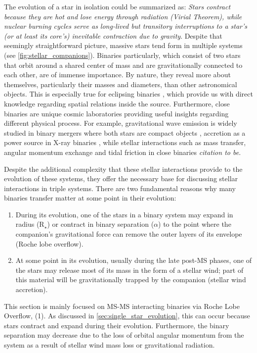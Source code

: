 The evolution of a star in isolation could be summarized as: {\it Stars contract because they are hot and lose energy through radiation (Virial Theorem), while nuclear burning cycles serve as long-lived but transitory interruptions to a star's (or at least its core's) inevitable contraction due to gravity}. Despite that seemingly straightforward picture, massive stars tend form in multiple systems (see \cref{fig:stellar_companions}). Binaries particularly, which consist of two stars that orbit around a shared center of mass and are gravitationally connected to each other, are of immense importance. By nature,  they reveal more about themselves, particularly their masses and diameters, than other astronomical objects. This is especially true for eclipsing binaries \citep{prvsa2016physics}, which provide us with direct knowledge regarding spatial relations inside the source. Furthermore, close binaries are unique cosmic laboratories providing useful insights regarding different physical process. For example, gravitational wave emission is widely studied in binary mergers where both stars are compact objects \citep{cutler1994gravitational,abbott2017gw170608,abbott2019gwtc}, accretion as a power source in X-ray binaries \citep{lewin1997x,reig2011x}, while stellar interactions such as mass transfer, angular momentum exchange and tidal friction in close binaries {\it citation to be}. 

Despite the additional complexity that these stellar interactions provide to the evolution of these systems, they offer the necessary base for discussing stellar interactions in triple systems.  There are two fundamental reasons why many binaries transfer matter at some point in their evolution:

\begin{enumerate}
    \item During its evolution, one of the stars in a binary system may expand in radius (R$_{\star}$) or contract in binary separation (${\alpha}$) to the point where the companion's gravitational force can remove the outer layers of its envelope (Roche lobe overflow).
    \item At some point in its evolution, usually during the late post-MS phases, one of the stars may release most of its mass in the form of a stellar wind; part of this material will be gravitationally trapped by the companion (stellar wind accretion). 
\end{enumerate}

This section is mainly focused on MS-MS interacting binaries via Roche Lobe Overflow, (1). As discussed in \cref{sec:single_star_evolution}, this can occur because stars contract and expand during their evolution. Furthermore, the binary separation may decrease due to the loss of orbital angular momentum from the system as a result of stellar wind mass loss or gravitational radiation. 

